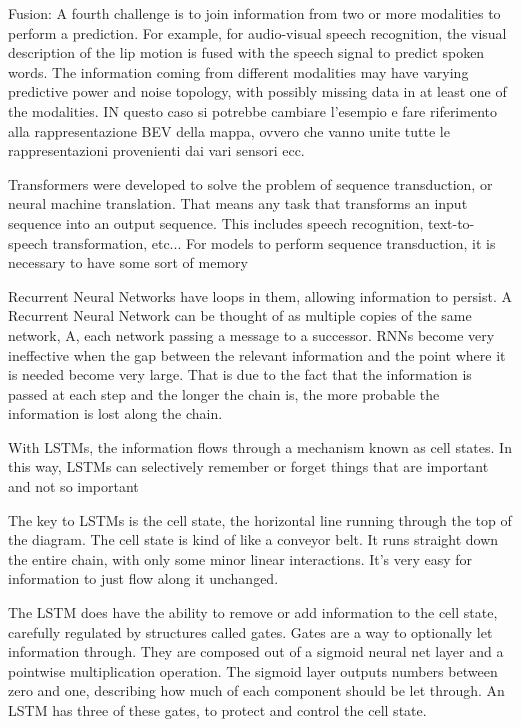 Fusion: A fourth challenge is to join information from two or more
modalities to perform a prediction.
For example, for audio-visual speech recognition, the visual description of
the lip motion is fused with the speech signal to predict spoken words.
The information coming from different modalities may have varying
predictive power and noise topology, with possibly missing data in at least
one of the modalities. IN questo caso si potrebbe cambiare l'esempio e fare riferimento alla rappresentazione BEV della mappa, ovvero che vanno unite tutte le rappresentazioni provenienti dai vari sensori ecc. 

Transformers were developed to solve the problem of sequence transduction, or
neural machine translation.
That means any task that transforms an input sequence into an output
sequence. This includes speech recognition, text-to-speech transformation,
etc...
For models to perform sequence transduction, it is necessary to have some sort
of memory

Recurrent Neural Networks have loops in them, allowing information to persist.
A Recurrent Neural Network can be thought of as multiple copies of the same
network, A, each network passing a message to a successor.
RNNs become very ineffective when the gap between the relevant information
and the point where it is needed become very large.
That is due to the fact that the information is passed at each step and the
longer the chain is, the more probable the information is lost along the chain.

With LSTMs, the information flows through a mechanism known as cell states.
In this way, LSTMs can selectively remember or forget things that are
important and not so important

The key to LSTMs is the cell state, the horizontal line running through the top
of the diagram.
The cell state is kind of like a conveyor belt. It runs straight down the entire
chain, with only some minor linear interactions. It’s very easy for information
to just flow along it unchanged.

The LSTM does have the ability to remove or add information to the cell
state, carefully regulated by structures called gates.
Gates are a way to optionally let information through. They are composed out
of a sigmoid neural net layer and a pointwise multiplication operation.
The sigmoid layer outputs numbers between
zero and one, describing how much of each
component should be let through.
An LSTM has three of these gates, to protect
and control the cell state.

